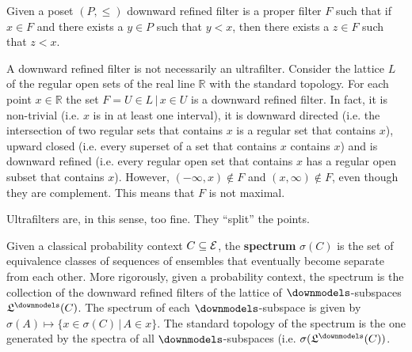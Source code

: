 \begin{mathSection}
\begin{defn}
	Given a poset $(P, \leq)$ downward refined filter is a proper filter $F$ such that if $x \in F$ and there exists a $y \in P$ such that $y < x$, then there exists a $z \in F$ such that $z < x$.
\end{defn}

\begin{remark}
	A downward refined filter is not necessarily an ultrafilter. Consider the lattice $L$ of the regular open sets of the real line $\mathbb{R}$ with the standard topology. For each point $x \in \mathbb{R}$ the set $F = {U \in L \, | \, x \in U}$ is a downward refined filter. In fact, it is non-trivial (i.e. $x$ is in at least one interval), it is downward directed (i.e. the intersection of two regular sets that contains $x$ is a regular set that contains $x$), upward closed (i.e. every superset of a set that contains $x$ contains $x$) and is downward refined (i.e. every regular open set that contains $x$ has a regular open subset that contains $x$). However, $(-\infty, x) \notin F$ and $(x, \infty) \notin F$, even though they are complement. This means that $F$ is not maximal.
	
	Ultrafilters are, in this sense, too fine. They ``split'' the points.
\end{remark}
	
\begin{defn}
	Given a classical probability context $C \subseteq \mathcal{E}$, the \textbf{spectrum} $\sigma(C)$ is the set of equivalence classes of sequences of ensembles that eventually become separate from each other. More rigorously, given a probability context, the spectrum is the collection of the downward refined filters of the lattice of $\separate$-subspaces $\mathfrak{L}^\separate(C)$. The spectrum of each $\separate$-subspace is given by $\sigma(A) \mapsto \{ x \in \sigma(C) \, | \, A \in x \}$. The standard topology of the spectrum is the one generated by the spectra of all $\separate$-subspaces (i.e. $\sigma(\mathfrak{L}^\separate(C))$.
\end{defn}


\end{mathSection}
